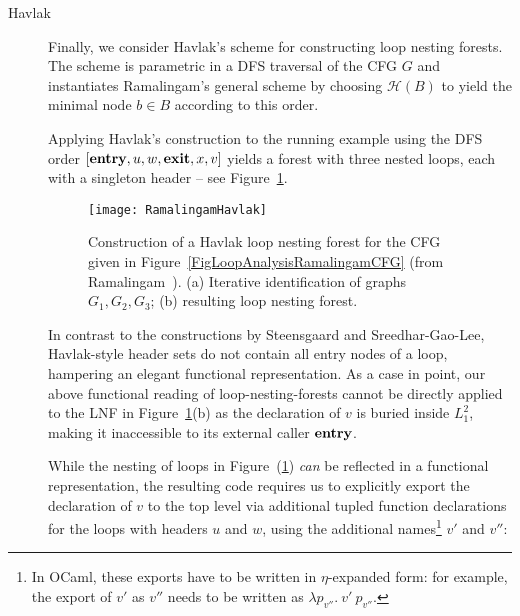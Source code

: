 \begin{description}
  \item[Havlak] Finally, we consider Havlak's scheme for constructing
    loop nesting forests. The scheme is parametric in a DFS traversal
    of the CFG $G$ and instantiates Ramalingam's general scheme by
    choosing $\mathcal{H}(B)$ to yield the minimal node $b\in B$
    according to this order.

    Applying Havlak's construction to the running example using the
    DFS order $[\mathbf{entry},u,w,\mathbf{exit},x,v]$ yields a forest with
    three nested loops, each with a singleton header -- see
    Figure~\ref{FigLoopAnalysisRamalingamHavlak}.
    \begin{figure}
      \begin{center}
        \texttt{[image: RamalingamHavlak]}
      \end{center}
      \caption{\label{FigLoopAnalysisRamalingamHavlak} Construction of
        a Havlak loop nesting forest for the CFG given in
        Figure~\ref{FigLoopAnalysisRamalingamCFG} (from
        Ramalingam~\cite{DBLP:journals/toplas/Ramalingam02}). (a) Iterative
        identification of graphs $G_1, G_2, G_3$; (b) resulting loop
        nesting forest.}
    \end{figure}

    In contrast to the constructions by Steensgaard and
    Sreedhar-Gao-Lee, Havlak-style header sets do not contain all
    entry nodes of a loop, hampering an elegant functional
    representation. As a case in point, our above functional reading
    of loop-nesting-forests cannot be directly applied to the LNF in
    Figure~\ref{FigLoopAnalysisRamalingamHavlak}(b) as the declaration
    of $v$ is buried inside $L^2_1$, making it inaccessible to its
    external caller $\mathbf{entry}$.

    While the nesting of loops in
    Figure~(\ref{FigLoopAnalysisRamalingamHavlak}) \emph{can} be
    reflected in a functional representation, the resulting code
    requires us to explicitly export the declaration of $v$ to the top
    level via additional tupled function declarations for the loops
    with headers $u$ and $w$, using the additional names\footnote{In
    OCaml, these exports have to be written in $\eta$-expanded form:
    for example, the export of $v'$ as $v''$ needs to be written as
    $\lambda p_{v''}.\ v'\ p_{v''}$.}  $v'$ and $v''$:


\end{description}
